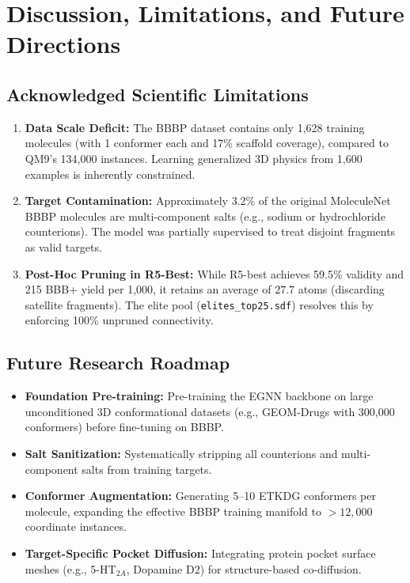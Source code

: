 \documentclass[11pt, a4paper]{article}
\begin{document}
\section{Discussion, Limitations, and Future Directions}

\subsection{Acknowledged Scientific Limitations}
\begin{enumerate}
    \item \textbf{Data Scale Deficit:} The BBBP dataset contains only 1,628 training molecules (with 1 conformer each and 17\% scaffold coverage), compared to QM9's 134,000 instances. Learning generalized 3D physics from 1,600 examples is inherently constrained.
    \item \textbf{Target Contamination:} Approximately 3.2\% of the original MoleculeNet BBBP molecules are multi-component salts (e.g., sodium or hydrochloride counterions). The model was partially supervised to treat disjoint fragments as valid targets.
    \item \textbf{Post-Hoc Pruning in R5-Best:} While R5-best achieves 59.5\% validity and 215 BBB+ yield per 1,000, it retains an average of $27.7$ atoms (discarding satellite fragments). The elite pool (\texttt{elites\_top25.sdf}) resolves this by enforcing 100\% unpruned connectivity.
\end{enumerate}

\subsection{Future Research Roadmap}
\begin{itemize}[noitemsep]
    \item \textbf{Foundation Pre-training:} Pre-training the EGNN backbone on large unconditioned 3D conformational datasets (e.g., GEOM-Drugs with 300,000 conformers) before fine-tuning on BBBP.
    \item \textbf{Salt Sanitization:} Systematically stripping all counterions and multi-component salts from training targets.
    \item \textbf{Conformer Augmentation:} Generating 5--10 ETKDG conformers per molecule, expanding the effective BBBP training manifold to $>12,000$ coordinate instances.
    \item \textbf{Target-Specific Pocket Diffusion:} Integrating protein pocket surface meshes (e.g., 5-HT$_{2A}$, Dopamine D2) for structure-based co-diffusion.
\end{itemize}
\end{document}
